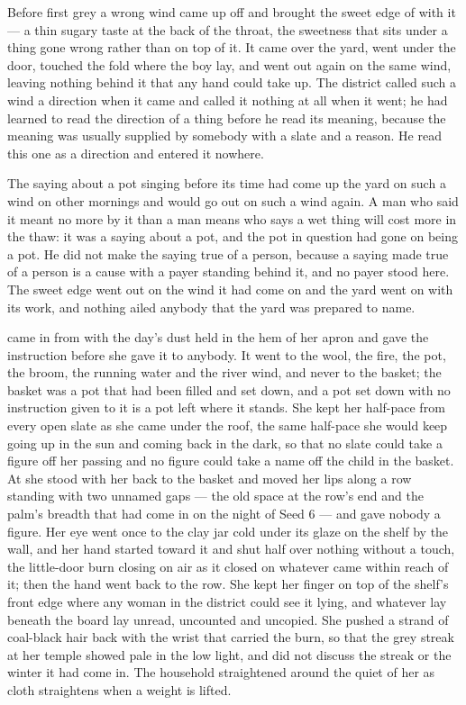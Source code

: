 \scenebreak

Before first grey a wrong wind came up off  and brought the sweet edge of  with it --- a thin sugary taste at the back of the throat, the sweetness that sits under a thing gone wrong rather than on top of it. It came over the yard, went under the door, touched the fold where the boy lay, and went out again on the same wind, leaving nothing behind it that any hand could take up. The district called such a wind a direction when it came and called it nothing at all when it went; he had learned to read the direction of a thing before he read its meaning, because the meaning was usually supplied by somebody with a slate and a reason. He read this one as a direction and entered it nowhere.

The saying about a pot singing before its time had come up the yard on such a wind on other mornings and would go out on such a wind again. A man who said it meant no more by it than a man means who says a wet thing will cost more in the thaw: it was a saying about a pot, and the pot in question had gone on being a pot. He did not make the saying true of a person, because a saying made true of a person is a cause with a payer standing behind it, and no payer stood here. The sweet edge went out on the wind it had come on and the yard went on with its work, and nothing ailed anybody that the yard was prepared to name.

\scenebreak

 came in from  with the day's dust held in the hem of her apron and gave the instruction before she gave it to anybody. It went to the wool, the fire, the pot, the broom, the running water and the river wind, and never to the basket; the basket was a pot that had been filled and set down, and a pot set down with no instruction given to it is a pot left where it stands. She kept her half-pace from every open slate as she came under the roof, the same half-pace she would keep going up in the sun and coming back in the dark, so that no slate could take a figure off her passing and no figure could take a name off the child in the basket. At  she stood with her back to the basket and moved her lips along a row standing with two unnamed gaps --- the old space at the row's end and the palm's breadth that had come in on the night of Seed 6 --- and gave nobody a figure. Her eye went once to the clay jar cold under its glaze on the shelf by the wall, and her hand started toward it and shut half over nothing without a touch, the little-door burn closing on air as it closed on whatever came within reach of it; then the hand went back to the row. She kept her finger on top of the shelf's front edge where any woman in the district could see it lying, and whatever lay beneath the board lay unread, uncounted and uncopied. She pushed a strand of coal-black hair back with the wrist that carried the burn, so that the grey streak at her temple showed pale in the low light, and did not discuss the streak or the winter it had come in. The household straightened around the quiet of her as cloth straightens when a weight is lifted.

